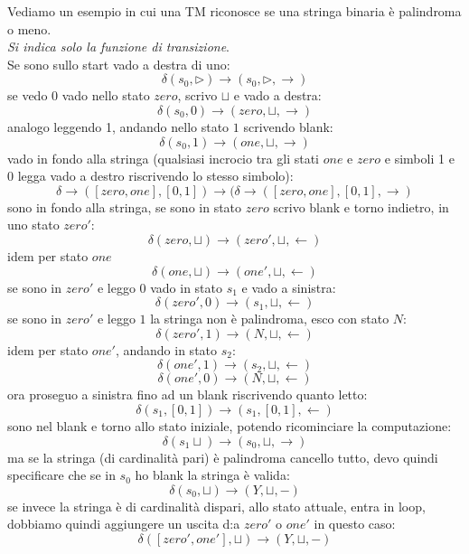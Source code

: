 \begin{esempio}
  Vediamo un esempio in cui una TM riconosce se una stringa binaria è
  palindroma o meno.\\
  \textit{Si indica solo la funzione di transizione}.\\
  Se sono sullo start vado a destra di uno:
  \[\delta(s_0,\triangleright)\to (s_0,\triangleright, \rightarrow)\]
  se vedo 0 vado nello stato $zero$, scrivo $\sqcup$ e vado a destra:
  \[\delta(s_0,0)\to (zero,\sqcup, \rightarrow)\]
  analogo leggendo 1, andando nello stato $1$ scrivendo blank:
  \[\delta(s_0,1)\to (one,\sqcup, \rightarrow)\]
  vado in fondo alla stringa (qualsiasi incrocio tra gli stati $one$ e $zero $ e
  simboli 1 e 0 legga vado a destro riscrivendo lo stesso simbolo):
  \[\delta\to([zero, one],[0,1])\to(\delta\to([zero, one],[0,1],\rightarrow)\]
  sono in fondo alla stringa, se sono in stato $zero$ scrivo blank e torno
  indietro, in uno stato $zero'$:
  \[\delta(zero, \sqcup)\to(zero', \sqcup, \leftarrow)\]
  idem per stato $one$
  \[\delta(one, \sqcup)\to(one', \sqcup, \leftarrow)\]
  se sono in $zero'$ e leggo $0$ vado in stato $s_1$ e vado a sinistra: 
  \[\delta(zero', 0)\to(s_1,\sqcup, \leftarrow)\]
  se sono in $zero'$ e leggo $1$ la stringa non è palindroma, esco con stato
  $N$:
  \[\delta(zero', 1)\to(N,\sqcup, \leftarrow)\]
  idem per stato $one'$, andando in stato $s_2$:
  \[\delta(one', 1)\to(s_2,\sqcup, \leftarrow)\]
  \[\delta(one', 0)\to(N,\sqcup, \leftarrow)\]
  ora proseguo a sinistra fino ad un blank riscrivendo quanto letto:
  \[\delta(s_1,[0,1])\to(s_1,[0,1], \leftarrow)\]
  sono nel blank e torno allo stato iniziale, potendo ricominciare la
  computazione:
  \[\delta(s_1\sqcup)\to(s_0,\sqcup, \rightarrow)\]
  ma se la stringa (di cardinalità pari) è palindroma cancello tutto, devo
  quindi specificare che se in $s_0$ ho blank la stringa è valida:
  \[\delta(s_0,\sqcup)\to(Y, \sqcup,-)\]
  se invece la stringa è di cardinalità dispari, allo stato attuale, entra in
  loop, dobbiamo quindi aggiungere un uscita d:a $zero'$ o $one'$ in questo
  caso:
  \[\delta([zero',one'], \sqcup)\to(Y, \sqcup, -)\]
\end{esempio}
